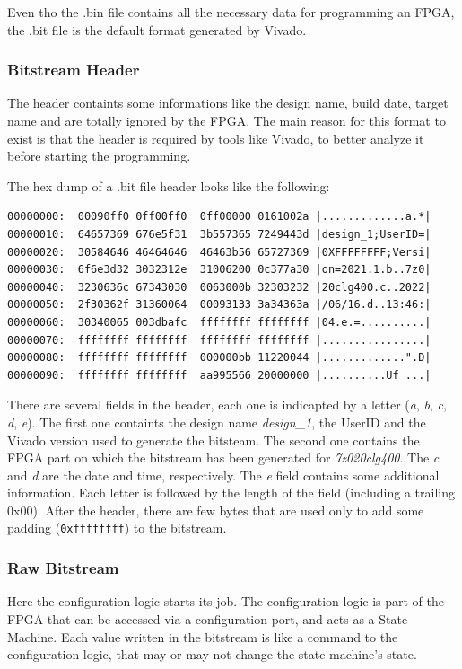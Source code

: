Even tho the .bin file contains all the necessary data for programming an FPGA, the .bit file is the default format generated by Vivado.

\subsubsection{Bitstream Header}
The header containts some informations like the design name, build date, target name and are totally ignored by the FPGA. The main reason for this format to exist is that the header is required by tools like Vivado, to better analyze it before starting the programming. \bigskip

The hex dump of a .bit file header looks like the following:

\begin{lstlisting}[style=preformatted]
00000000:  00090ff0 0ff00ff0  0ff00000 0161002a |.............a.*|
00000010:  64657369 676e5f31  3b557365 7249443d |design_1;UserID=|
00000020:  30584646 46464646  46463b56 65727369 |0XFFFFFFFF;Versi|
00000030:  6f6e3d32 3032312e  31006200 0c377a30 |on=2021.1.b..7z0|
00000040:  3230636c 67343030  0063000b 32303232 |20clg400.c..2022|
00000050:  2f30362f 31360064  00093133 3a34363a |/06/16.d..13:46:|
00000060:  30340065 003dbafc  ffffffff ffffffff |04.e.=..........|
00000070:  ffffffff ffffffff  ffffffff ffffffff |................|
00000080:  ffffffff ffffffff  000000bb 11220044 |.............".D|
00000090:  ffffffff ffffffff  aa995566 20000000 |..........Uf ...|
\end{lstlisting}

There are several fields in the header, each one is indicapted by a letter (\textit{a}, \textit{b}, \textit{c}, \textit{d}, \textit{e}). The first one containts the design name \textit{design\_1}, the UserID and the Vivado version used to generate the bitsteam. The second one contains the FPGA part on which the bitstream has been generated for \textit{7z020clg400}. The \textit{c} and \textit{d} are the date and time, respectively. The \textit{e} field contains some additional information. Each letter is followed by the length of the field (including a trailing 0x00). After the header, there are few bytes that are used only to add some padding (\texttt{0xffffffff}) to the bitstream. 

\subsubsection{Raw Bitstream}
\label{sec:raw_bitstream}
Here the configuration logic starts its job. The configuration logic is part of the FPGA that can be accessed via a configuration port, and acts as a State Machine. Each value written in the bitstream is like a command to the configuration logic, that may or may not change the state machine's state. \bigskip

